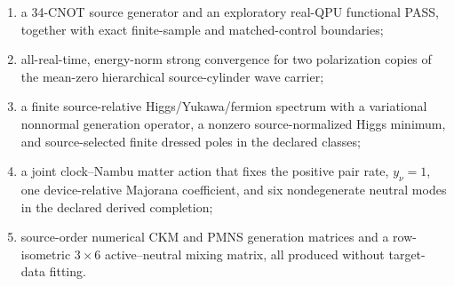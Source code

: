 \documentclass[11pt]{article}
\theoremstyle{definition}
\theoremstyle{remark}
\begin{document}
\begin{enumerate}
\item a 34-CNOT source generator and an exploratory real-QPU functional PASS, together with exact finite-sample and matched-control boundaries;
\item all-real-time, energy-norm strong convergence for two polarization copies of the mean-zero hierarchical source-cylinder wave carrier;
\item a finite source-relative Higgs/Yukawa/fermion spectrum with a variational nonnormal generation operator, a nonzero source-normalized Higgs minimum, and source-selected finite dressed poles in the declared classes;
\item a joint clock--Nambu matter action that fixes the positive pair rate, $y_\nu=1$, one device-relative Majorana coefficient, and six nondegenerate neutral modes in the declared derived completion;
\item source-order numerical CKM and PMNS generation matrices and a row-isometric $3\times6$ active--neutral mixing matrix, all produced without target-data fitting.
\end{enumerate}
\end{document}
